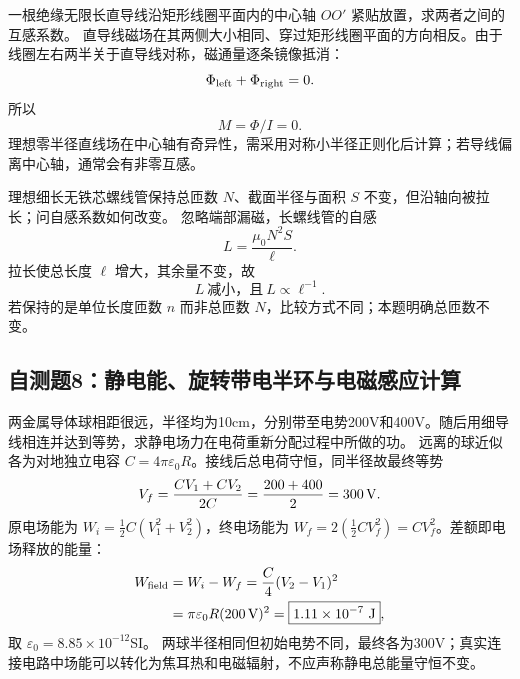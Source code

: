 \problemtext 一根绝缘无限长直导线沿矩形线圈平面内的中心轴 $OO'$ 紧贴放置，求两者之间的互感系数。
\workings 直导线磁场在其两侧大小相同、穿过矩形线圈平面的方向相反。由于线圈左右两半关于直导线对称，磁通量逐条镜像抵消：
\[\Phi_{\rm left}+\Phi_{\rm right}=0.\]
所以
\[\boxed{M=\Phi/I=0}.\]
\crosscheck 理想零半径直线场在中心轴有奇异性，需采用对称小半径正则化后计算；若导线偏离中心轴，通常会有非零互感。

\problemtext 理想细长无铁芯螺线管保持总匝数 $N$、截面半径与面积 $S$ 不变，但沿轴向被拉长；问自感系数如何改变。
\workings 忽略端部漏磁，长螺线管的自感
\[L=\frac{\mu_0N^2S}{\ell}.\]
拉长使总长度 $\ell$ 增大，其余量不变，故
\[\boxed{L\ \text{减小，且}\ L\propto\ell^{-1}}.\]
\crosscheck 若保持的是单位长度匝数 $n$ 而非总匝数 $N$，比较方式不同；本题明确总匝数不变。

\subsection{自测题8：静电能、旋转带电半环与电磁感应计算}

\problemtext 两金属导体球相距很远，半径均为10cm，分别带至电势200V和400V。随后用细导线相连并达到等势，求静电场力在电荷重新分配过程中所做的功。
\workings 远离的球近似各为对地独立电容 $C=4\pi\varepsilon_0 R$。接线后总电荷守恒，同半径故最终等势
\[V_f=\frac{CV_1+CV_2}{2C}=\frac{200+400}{2}=300\,{\rm V}.\]
原电场能为 $W_i=\tfrac12 C(V_1^2+V_2^2)$，终电场能为 $W_f=2(\tfrac12CV_f^2)=CV_f^2$。差额即电场释放的能量：
\[
\begin{aligned}
W_{\rm field}&=W_i-W_f=\frac C4(V_2-V_1)^2\\
&=\pi\varepsilon_0 R(200\,{\rm V})^2
=\boxed{1.11\times10^{-7}\ {\rm J}},
\end{aligned}
\]
取 $\varepsilon_0=8.85\times10^{-12}$SI。
\crosscheck 两球半径相同但初始电势不同，最终各为300V；真实连接电路中场能可以转化为焦耳热和电磁辐射，不应声称静电总能量守恒不变。

